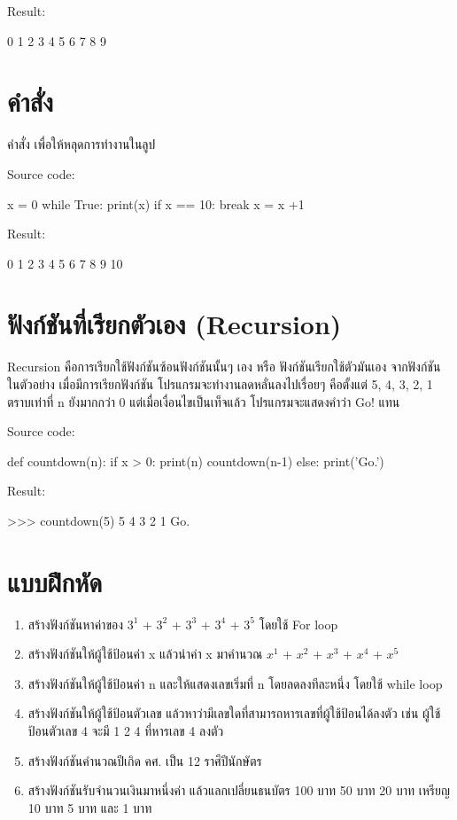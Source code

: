 Result:
\begin{codelist}{}{}
0
1
2
3
4
5
6
7
8
9
\end{codelist}

\section{คำสั่ง  }

คำสั่ง   เพื่อให้หลุดการทำงานในลูป

Source code:
\begin{codelist}{}{}
x = 0
while True:
    print(x)
    if x == 10: break
    x = x +1
\end{codelist}

Result:
\begin{codelist}{}{}
0
1
2
3
4
5
6
7
8
9
10
\end{codelist}


\section{ฟังก์ชันที่เรียกตัวเอง (Recursion)}

Recursion คือการเรียกใช้ฟังก์ชันซ้อนฟังก์ชันนั้นๆ เอง หรือ ฟังก์ชันเรียกใช้ตัวมันเอง จากฟังก์ชัน   ในตัวอย่าง เมื่อมีการเรียกฟังก์ชัน   โปรแกรมจะทำงานลดหลั่นลงไปเรื่อยๆ คือตั้งแต่ 5, 4, 3, 2, 1 ตราบเท่าที่ n ยังมากกว่า 0 แต่เมื่อเงื่อนไขเป็นเท็จแล้ว โปรแกรมจะแสดงคำว่า Go! แทน

Source code:
\begin{codelist}{}{}
def countdown(n):
    if x > 0:
        print(n)
        countdown(n-1)
    else:
        print('Go.')
\end{codelist}
Result:
\begin{codelist}{}{}
>>> countdown(5)
5
4
3
2
1
Go.
\end{codelist}


\section{แบบฝึกหัด}
\begin{enumerate} 

\item 	สร้างฟังก์ชันหาค่าของ  $3^1$ + $3^2$ + $3^3$ + $3^4$ + $3^5$  โดยใช้ For loop
\item 	สร้างฟังก์ชันให้ผู้ใช้ป้อนค่า x แล้วนำค่า x มาคำนวณ $x^1$ + $x^2$ + $x^3$ + $x^4$ + $x^5$
\item 	สร้างฟังก์ชันให้ผู้ใช้ป้อนค่า n และให้แสดงเลขเริ่มที่ n โดยลดลงทีละหนึ่ง โดยใช้ while loop
\item 	สร้างฟังก์ชันให้ผู้ใช้ป้อนตัวเลข แล้วหาว่ามีเลขใดที่สามารถหารเลขที่ผู้ใช้ป้อนได้ลงตัว เช่น ผู้ใช้ป้อนตัวเลข 4 จะมี 1 2 4 ที่หารเลข 4 ลงตัว
\item 	สร้างฟังก์ชันคำนวณปีเกิด คศ. เป็น 12 ราศีปีนักษัตร
\item 	สร้างฟังก์ชันรับจำนวนเงินมาหนึ่งค่า แล้วแลกเปลี่ยนธนบัตร 100 บาท 50 บาท 20 บาท เหรียญ 10 บาท 5 บาท และ 1 บาท
\end{enumerate}
